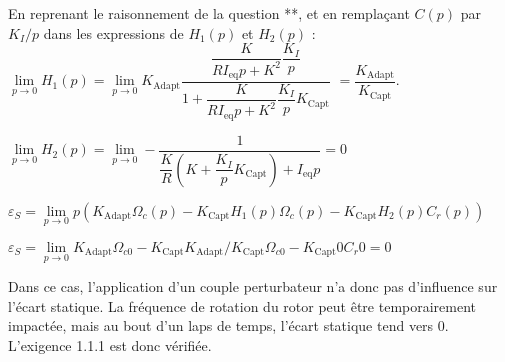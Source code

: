 \begin{multicols}{2}


\ifprof
\begin{corrige}


En reprenant le raisonnement de la question **, et en remplaçant $C(p)$ par $K_I/p$ dans les expressions de $H_1 (p)$ et $H_2 (p)$ :
$\lim\limits_{p\to 0}  H_1 (p)=\lim\limits_{p\to 0}  K_{\text{Adapt}} \dfrac{\dfrac{K}{R I_{\text{eq}} p+K^2}\dfrac{ K_I}{p}}{1+\dfrac{K}{R I_{\text{eq}} p+K^2 } \dfrac{K_I}{p} K_{\text{Capt}} }$
$=\dfrac{K_{\text{Adapt}}}{K_{\text{Capt}}}$.

$\lim\limits_{p\to 0}  H_2 (p)=\lim\limits_{p\to 0}  -\dfrac{1}{\dfrac{K}{R} \left(K+\dfrac{K_I}{p} K_{\text{Capt}} \right)+I_{\text{eq}} p}=0$

$\varepsilon_S=\lim\limits_{p\to 0}  p \left(K_{\text{Adapt}} \Omega_c (p)-K_{\text{Capt}} H_1 (p) \Omega_c (p)-K_{\text{Capt}} H_2 (p) C_r (p)\right) $

$\varepsilon_S=\lim\limits_{p\to 0} K_{\text{Adapt}} \Omega_{c0}-K_{\text{Capt}} K_{\text{Adapt}}/K_{\text{Capt}}  \Omega_{c0}-K_{\text{Capt}} 0 C_r0 =0$

Dans ce cas, l’application d’un couple perturbateur n’a donc pas d’influence sur l’écart statique. La fréquence de rotation du rotor peut être temporairement impactée, mais au bout d’un laps de temps, l’écart statique tend vers 0. L’exigence 1.1.1 est donc vérifiée.

\end{corrige}
\else
\fi



\ifprof
\else
\end{multicols}
\fi